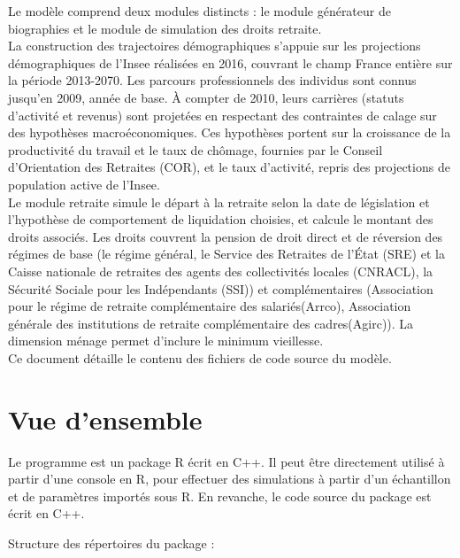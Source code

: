 Le modèle comprend deux modules distincts : le module générateur de biographies et le module de simulation des droits retraite.\\
La construction des trajectoires démographiques s'appuie sur les projections démographiques de l'Insee réalisées en 2016, couvrant le champ France entière sur la période 2013-2070. Les parcours professionnels des individus sont connus jusqu’en 2009, année de base. \`A compter de 2010, leurs carrières (statuts d’activité et revenus) sont projetées en respectant des contraintes de calage sur des hypothèses macroéconomiques. Ces hypothèses portent sur la croissance de la productivité du travail et le taux de chômage, fournies par le Conseil d'Orientation des Retraites (COR), et le taux d'activité, repris des projections de population active de l'Insee.\\
Le module retraite simule le départ à la retraite selon la date de législation et l'hypothèse de comportement de liquidation choisies, et calcule le montant des droits associés. Les droits couvrent la pension de droit direct et de réversion des régimes de base (le régime général, le Service des Retraites de l'État (SRE) et la Caisse nationale de retraites des agents des collectivités locales (CNRACL), la Sécurité Sociale pour les Indépendants (SSI)) et complémentaires (Association pour le régime de retraite complémentaire des salariés(Arrco), Association générale des institutions de retraite complémentaire des cadres(Agirc)). La dimension ménage permet d'inclure le minimum vieillesse.\\
Ce document détaille le contenu des fichiers de code source du modèle. 



\section{Vue d'ensemble}

Le programme est un package R écrit en C++. Il peut
être directement utilisé à partir d'une console en R, 
pour effectuer des simulations à partir d'un échantillon et de paramètres importés sous R. En revanche, le code source du package est écrit en C++. 

Structure des répertoires du package :

